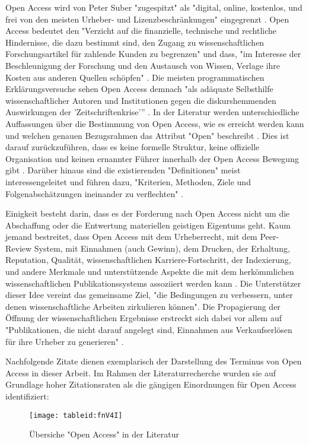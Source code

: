 Open Access wird von Peter Suber "zugespitzt" \cite{naeder_2010_open} als "digital, online, kostenlos, und frei von den meisten Urheber- und Lizenzbeschränkungen" \cite{suber_2012_open} eingegrenzt \cite{Adema_2014_open_access}. Open Access bedeutet den "Verzicht auf die finanzielle, technische und rechtliche Hindernisse, die dazu bestimmt sind, den Zugang zu wissenschaftlichen Forschungsartikel für zahlende Kunden zu begrenzen" und dass, "im Interesse der Beschleunigung der Forschung und den Austausch von Wissen, Verlage ihre Kosten aus anderen Quellen schöpfen" \cite{Suber_2002}. Die meisten programmatischen Erklärungsversuche sehen Open Access demnach "als adäquate Selbsthilfe wissenschaftlicher Autoren und Institutionen gegen die diskurshemmenden Auswirkungen der 'Zeitschriftenkrise'” \cite{naeder_2010_open}. In der Literatur werden unterschiedliche Auffassungen über die Bestimmung von Open Access, wie es erreicht werden kann und welchen genauen Bezugsrahmen das Attribut "Open" beschreibt \cite{Adema_2014_open_access} \cite{cite:17}. Dies ist darauf zurückzuführen, dass es keine formelle Struktur, keine offizielle Organisation und keinen ernannter Führer innerhalb der Open Access Bewegung gibt \cite{poynder_2011_suber}. Darüber hinaus sind die existierenden "Definitionen" meist interessengeleitet und führen dazu, "Kriterien, Methoden, Ziele und Folgenabschätzungen ineinander zu verflechten" \cite{naeder_2010_open}.

Einigkeit besteht darin, dass es der Forderung nach Open Access nicht um die Abschaffung oder die Entwertung materiellen geistigen Eigentums geht. Kaum jemand bestreitet, dass Open Access mit dem Urheberrecht, mit dem Peer-Review System, mit Einnahmen (auch Gewinn), dem Drucken, der Erhaltung, Reputation, Qualität, wissenschaftlichen Karriere-Fortschritt, der Indexierung, und andere Merkmale und unterstützende Aspekte die mit dem herkömmlichen wissenschaftlichen Publikationssystems assoziiert werden kann \cite{suber_2015}. Die Unterstützer dieser Idee vereint das gemeinsame Ziel, "die Bedingungen zu verbessern, unter denen wissenschaftliche Arbeiten zirkulieren können"\cite{Adema_2014_open_access}. Die Propagierung der Öffnung der wissenschaftlichen Ergebnisse erstreckt sich dabei vor allem auf "Publikationen, die nicht darauf angelegt sind, Einnahmen aus Verkaufserlösen für ihre Urheber zu generieren" \cite{muller_2010_open}.

Nachfolgende Zitate dienen exemplarisch der Darstellung des Terminus von Open Access in dieser Arbeit. Im Rahmen der Literaturrecherche wurden sie auf Grundlage hoher Zitationsraten als die gängigen Einordnungen für Open Access identifiziert:
\begin{figure}[h!]
\texttt{[image: tableid:fnV4I]}
\caption{Übersiche "Open Access" in der Literatur}
\end{figure}

